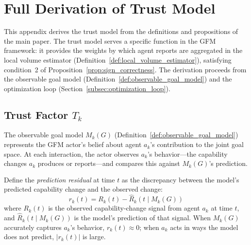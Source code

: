 %

\section{Full Derivation of Trust Model}
\label{app:trust_model}

This appendix derives the trust model from the definitions and propositions of the main paper. The trust model serves a specific function in the GFM framework: it provides the weights by which agent reports are aggregated in the local volume estimator (Definition~\ref{def:local_volume_estimator}), satisfying condition~2 of Proposition~\ref{prop:sign_correctness}. The derivation proceeds from the observable goal model (Definition~\ref{def:observable_goal_model}) and the optimization loop (Section~\ref{subsec:optimization_loop}).


\subsection{Trust Factor \texorpdfstring{$T_k$}{T\_k}}
\label{app:trust_factor}

The observable goal model $M_k(G)$ (Definition~\ref{def:observable_goal_model}) represents the GFM actor's belief about agent $a_k$'s contribution to the joint goal space. At each interaction, the actor observes $a_k$'s behavior---the capability changes $a_k$ produces or reports---and compares this against $M_k(G)$'s prediction.

Define the \emph{prediction residual} at time $t$ as the discrepancy between the model's predicted capability change and the observed change:
\begin{equation}
\label{eq:prediction_residual}
r_k(t) = R_k(t) - \hat{R}_k(t \mid M_k(G))
\end{equation}
where $R_k(t)$ is the observed capability-change signal from agent $a_k$ at time $t$, and $\hat{R}_k(t \mid M_k(G))$ is the model's prediction of that signal. When $M_k(G)$ accurately captures $a_k$'s behavior, $r_k(t) \approx 0$; when $a_k$ acts in ways the model does not predict, $|r_k(t)|$ is large.

